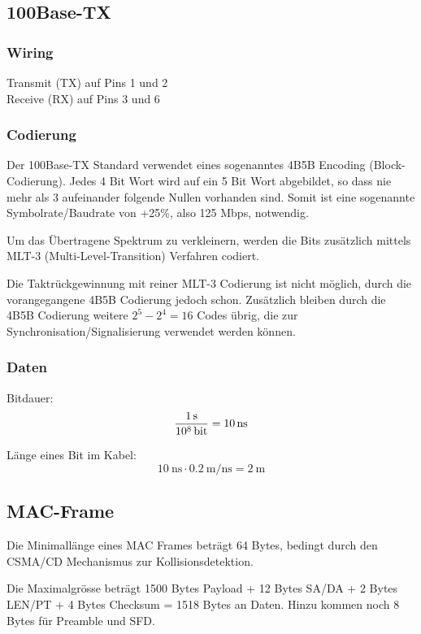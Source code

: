 \subsection{100Base-TX}

\subsubsection{Wiring}

Transmit (TX) auf Pins 1 und 2\\
Receive (RX) auf Pins 3 und 6

\subsubsection{Codierung}

Der 100Base-TX Standard verwendet eines sogenanntes 4B5B Encoding
(Block-Codierung). Jedes 4 Bit Wort wird auf ein 5 Bit Wort abgebildet, so dass
nie mehr als 3 aufeinander folgende Nullen vorhanden sind. Somit ist eine
sogenannte Symbolrate/Baudrate von +25\%, also 125 Mbps, notwendig.

Um das Übertragene Spektrum zu verkleinern, werden die Bits zusätzlich mittels
MLT-3 (Multi-Level-Transition) Verfahren codiert.

Die Taktrückgewinnung mit reiner MLT-3 Codierung ist nicht möglich, durch die
vorangegangene 4B5B Codierung jedoch schon. Zusätzlich bleiben durch die 4B5B
Codierung weitere $2^5-2^4=16$ Codes übrig, die zur
Synchronisation/Signalisierung verwendet werden können.

\subsubsection{Daten}

Bitdauer:
\[
	\frac{\SI{1}{\second}}{\SI{e8}{\bit}} = \SI{10}{\ns}
\]

Länge eines Bit im Kabel:
\[
	\SI{10}{\ns} \cdot \SI{0.2}{\meter\per\ns} = \SI{2}{\meter}
\]


\subsection{MAC-Frame}

Die Minimallänge eines MAC Frames beträgt 64 Bytes, bedingt durch den CSMA/CD
Mechanismus zur Kollisionsdetektion.

Die Maximalgrösse beträgt 1500 Bytes Payload + 12 Bytes SA/DA + 2 Bytes LEN/PT +
4 Bytes Checksum = 1518 Bytes an Daten. Hinzu kommen noch 8 Bytes für Preamble
und SFD.

